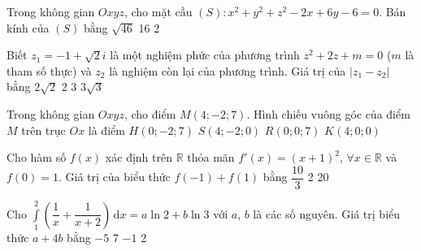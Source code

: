 \begin{ex}%
Trong không gian $Oxyz$, cho mặt cầu $(S)\colon x^2+y^2+z^2-2x+6y-6=0$. Bán kính của $(S)$ bằng
\choice
{$\sqrt{46}$}
{16}
{2}
{}
\end{ex}

\begin{ex}%
Biết $z_1 = -1 +\sqrt{2}i$ là một nghiệm phức của phương trình $z^2+2z+m=0$ ($m$ là tham số thực) và $z_2$ là nghiệm còn lại của phương trình. Giá trị của $\left| z_1  - z_2 \right|$ bằng
\choice
{\True $2\sqrt{2}$}
{2}
{3}
{$3\sqrt{3}$}
\end{ex}

\begin{ex}%
Trong không gian $Oxyz$, cho điểm $M(4;-2;7)$. Hình chiếu vuông góc của điểm $M$ trên trục $Ox$ là điểm
\choice
{$H(0;-2;7)$}
{$S(4;-2;0)$}
{$R(0;0;7)$}
{\True $K(4;0;0)$}
\end{ex}

\begin{ex}%
Cho hàm số $f(x)$ xác định trên $\mathbb{R}$ thỏa mãn $f'(x)=(x+1)^2$, $\forall x\in \mathbb{R}$ và $f(0)=1$. Giá trị của biểu thức $f(-1)+f(1)$ bằng
\choice
{}
{$\dfrac{10}{3}$}
{2}
{20}
\end{ex}

\begin{ex}%
Cho $\displaystyle\int\limits_1^2 \left(\dfrac{1}{x}+\dfrac{1}{x+2}\right) \mathrm{\,d}x = a\ln 2 +b \ln 3$ với $a$, $b$ là các số nguyên. Giá trị biểu thức $a+4b$ bằng
\choice
{$-5$}
{7}
{\True $-1$}
{2}
\end{ex}

